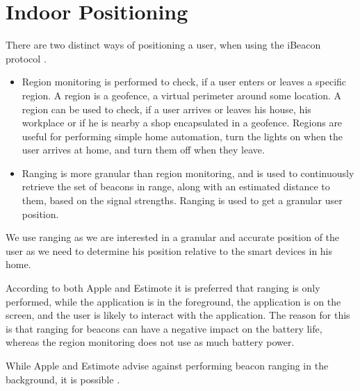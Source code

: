 \section{Indoor Positioning}
\label{sec:design:indoor-positioning}

There are two distinct ways of positioning a user, 
when using the iBeacon protocol \cite{estimote:monitoring-ranging}.

\begin{itemize}
\item Region monitoring is performed to check, if a user enters or leaves a specific region. A region is a geofence, \ie a virtual perimeter around some location. A region can be used to check, if a user arrives or leaves his house, his workplace or if he is nearby a shop encapsulated in a geofence. Regions are useful for performing simple home automation, \eg turn the lights on when the user arrives at home, and turn them off when they leave.
\item Ranging is more granular than region monitoring, and is used to continuously retrieve the set of beacons in range, along with an estimated distance to them, based on the signal strengths. Ranging is used to get a granular user position.
\end{itemize}

We use ranging as we are interested in a granular and accurate position of the user as
we need to determine his position relative to the smart devices in his home.

According to both Apple and Estimote it is preferred that ranging is only performed, 
while the application is in the foreground, 
\ie the application is on the screen, 
and the user is likely to interact with the application. 
The reason for this is that ranging for beacons can have a negative impact on the battery life, 
whereas the region monitoring does not use as much battery power.

While Apple and Estimote advise against performing beacon ranging in the background, 
it is possible \cite{apple:monitoring-ibeacon,estimote:monitoring-ranging}.



